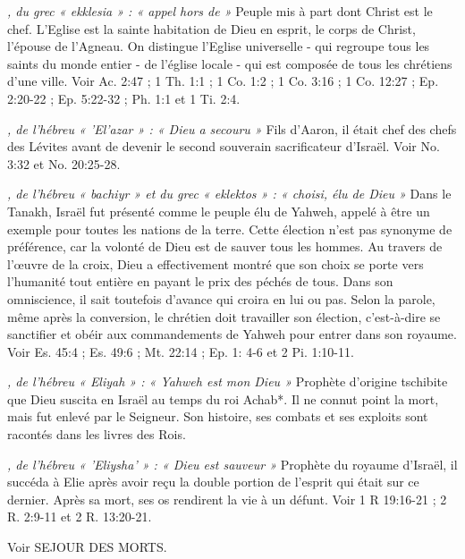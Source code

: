 \begin{multicols}{2}
\textit{, du grec « ekklesia » : « appel hors de »}\newline
Peuple mis à part dont Christ est le chef. L'Eglise est la sainte habitation de Dieu en esprit, le corps de Christ, l'épouse de l'Agneau. On distingue l'Eglise universelle - qui regroupe tous les saints du monde entier - de l'église locale - qui est composée de tous les chrétiens d'une ville. Voir Ac. 2:47 ; 1 Th. 1:1 ; 1 Co. 1:2 ; 1 Co. 3:16 ; 1 Co. 12:27 ; Ep. 2:20-22 ; Ep. 5:22-32 ; Ph. 1:1 et 1 Ti. 2:4.

\textit{, de l'hébreu « 'El'azar » : « Dieu a secouru »}\newline
Fils d'Aaron, il était chef des chefs des Lévites avant de devenir le second souverain sacrificateur d'Israël. Voir No. 3:32 et No. 20:25-28.

\textit{, de l'hébreu « bachiyr » et du grec « eklektos » : « choisi, élu de Dieu »}\newline
Dans le Tanakh, Israël fut présenté comme le peuple élu de Yahweh, appelé à être un exemple pour toutes les nations de la terre. Cette élection n'est pas synonyme de préférence, car la volonté de Dieu est de sauver tous les hommes. Au travers de l'œuvre de la croix, Dieu a effectivement montré que son choix se porte vers l'humanité tout entière en payant le prix des péchés de tous. Dans son omniscience, il sait toutefois d'avance qui croira en lui ou pas. Selon la parole, même après la conversion, le chrétien doit travailler son élection, c'est-à-dire se sanctifier et obéir aux commandements de Yahweh pour entrer dans son royaume. Voir Es. 45:4 ; Es. 49:6 ; Mt. 22:14 ; Ep. 1: 4-6 et 2 Pi. 1:10-11.

\textit{, de l'hébreu « Eliyah » : « Yahweh est mon Dieu »}\newline
Prophète d'origine tschibite que Dieu suscita en Israël au temps du roi Achab*. Il ne connut point la mort, mais fut enlevé par le Seigneur. Son histoire, ses combats et ses exploits sont racontés dans les livres des Rois.

\textit{, de l'hébreu « 'Eliysha' » : « Dieu est sauveur »}\newline
Prophète du royaume d'Israël, il succéda à Elie après avoir reçu la double portion de l'esprit qui était sur ce dernier. Après sa mort, ses os rendirent la vie à un défunt. Voir 1 R 19:16-21 ; 2 R. 2:9-11 et 2 R. 13:20-21.

\textit{}\newline
Voir SEJOUR DES MORTS.


\end{multicols}
